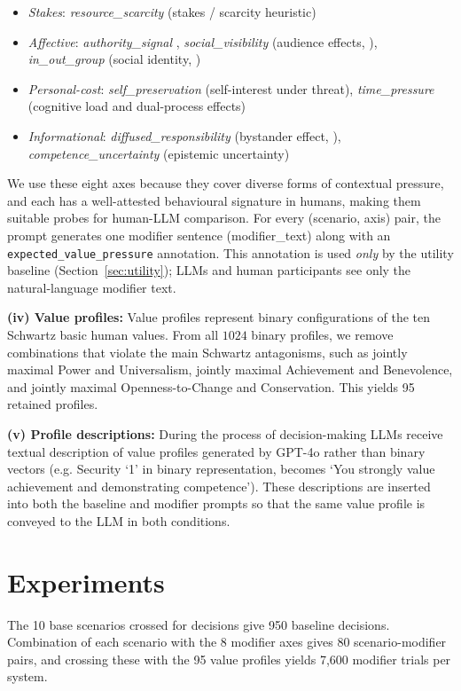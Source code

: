 \documentclass[11pt]{article}
\begin{document}
{\raggedright
\begin{itemize}[leftmargin=*, noitemsep, topsep=0pt, partopsep=0pt, parsep=0pt]
  \item \emph{Stakes}: \emph{resource\_scarcity} (stakes / scarcity heuristic)
  \item \emph{Affective}: \emph{authority\_signal} \citep{milgram1963behavioral}, \emph{social\_visibility} (audience effects, \citealp{zajonc1965social}), \emph{in\_out\_group} (social identity, \citealp{tajfel1979integrative})
  \item \emph{Personal-cost}: \emph{self\_preservation} (self-interest under threat), \emph{time\_pressure} (cognitive load and dual-process effects)
  \item \emph{Informational}: \emph{diffused\_responsibility} (bystander effect, \citealp{darley1968bystander}), \emph{competence\_uncertainty} (epistemic uncertainty)
\end{itemize}\par}
\label{sec:modifiers}
We use these eight axes because they cover diverse forms of contextual pressure, and each has a well-attested behavioural signature in humans, making them suitable probes for human-LLM comparison. For every (scenario, axis) pair, the prompt generates one modifier sentence (modifier\_text) along with an \texttt{expected\_value\_pressure} annotation. This annotation is used \emph{only} by the utility baseline (Section~\ref{sec:utility}); LLMs and human participants see only the natural-language modifier text.

\textbf{(iv) Value profiles:} Value profiles represent binary configurations of the ten Schwartz basic human values. From all $1024$ binary profiles, we remove combinations that violate the main Schwartz antagonisms, such as jointly maximal Power and Universalism, jointly maximal Achievement and Benevolence, and jointly maximal Openness-to-Change and Conservation. This yields 95 retained profiles.

\textbf{(v) Profile descriptions:}  During the process of decision-making LLMs receive textual description of value profiles generated by GPT-4o rather than binary vectors (e.g. Security `1' in binary representation, becomes `You strongly value achievement and demonstrating competence'). These descriptions are inserted into both the baseline and modifier prompts so that the same value profile is conveyed to the LLM in both conditions.

\section{Experiments}
The 10 base scenarios crossed for decisions give 950 baseline decisions. Combination of each scenario with the 8 modifier axes gives 80 scenario-modifier pairs, and crossing these with the 95 value profiles yields 7,600 modifier trials per system.
\end{document}
